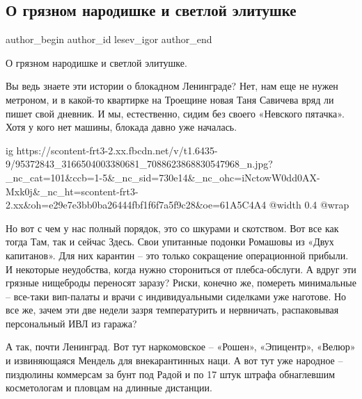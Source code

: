  
 
 
 
 
 
\subsection{О грязном народишке и светлой элитушке}
\label{sec:29_04_2020.fb.lesev_igor.1.narodishko_elitushka}
 
\ifcmt
 author_begin
   author_id lesev_igor
 author_end
\fi

О грязном народишке и светлой элитушке.

Вы ведь знаете эти истории о блокадном Ленинграде? Нет, нам еще не нужен
метроном, и в какой-то квартирке на Троещине новая Таня Савичева вряд ли пишет
свой дневник. И мы, естественно, сидим без своего «Невского пятачка». Хотя у
кого нет машины, блокада давно уже началась.

\ifcmt
  ig https://scontent-frt3-2.xx.fbcdn.net/v/t1.6435-9/95372843_3166504003380681_7088623868830547968_n.jpg?_nc_cat=101&ccb=1-5&_nc_sid=730e14&_nc_ohc=iNctowW0dd0AX-Mxk0j&_nc_ht=scontent-frt3-2.xx&oh=e29e7e3bb0ba26444fbf1f6f7a5f9c28&oe=61A5C4A4
  @width 0.4
  @wrap 
\fi

Но вот с чем у нас полный порядок, это со шкурами и скотством. Вот все как
тогда Там, так и сейчас Здесь. Свои упитанные подонки Ромашовы из «Двух
капитанов». Для них карантин – это только сокращение операционной прибыли. И
некоторые неудобства, когда нужно сторониться от плебса-обслуги. А вдруг эти
грязные нищеброды переносят заразу? Риски, конечно же, помереть минимальные –
все-таки вип-палаты и врачи с индивидуальными сиделками уже наготове. Но все
же, зачем эти две недели зазря температурить и нервничать, распаковывая
персональный ИВЛ из гаража?

А так, почти Ленинград. Вот тут наркомовское – «Рошен», «Эпицентр», «Велюр» и
извиняющаяся Мендель для внекарантинных наци. А вот тут уже народное –
пиздюлины коммерсам за бунт под Радой и по 17 штук штрафа обнаглевшим
косметологам и пловцам на длинные дистанции.

